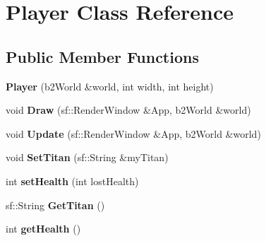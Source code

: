 \hypertarget{class_player}{}\section{Player Class Reference}
\label{class_player}
\subsection*{Public Member Functions}
\begin{DoxyCompactItemize}
\item 
{\bfseries Player} (b2\+World \&world, int width, int height)\hypertarget{class_player_a45259de566657544f89425bafdbf1eb5}{}\label{class_player_a45259de566657544f89425bafdbf1eb5}

\item 
void {\bfseries Draw} (sf\+::\+Render\+Window \&App, b2\+World \&world)\hypertarget{class_player_aa971414575a564645a3edfd906dd3b5a}{}\label{class_player_aa971414575a564645a3edfd906dd3b5a}

\item 
void {\bfseries Update} (sf\+::\+Render\+Window \&App, b2\+World \&world)\hypertarget{class_player_a8bb4ad7a5be7d84b428f6616656fb40b}{}\label{class_player_a8bb4ad7a5be7d84b428f6616656fb40b}

\item 
void {\bfseries Set\+Titan} (sf\+::\+String \&my\+Titan)\hypertarget{class_player_a3cdf52f3a4a76238113f3f5fb5a69244}{}\label{class_player_a3cdf52f3a4a76238113f3f5fb5a69244}

\item 
int {\bfseries set\+Health} (int lost\+Health)\hypertarget{class_player_a1b53c75a88ca704bfedf7d679d4e8666}{}\label{class_player_a1b53c75a88ca704bfedf7d679d4e8666}

\item 
sf\+::\+String {\bfseries Get\+Titan} ()\hypertarget{class_player_a7ea1821a2e2a67f2213dbc4803e2994e}{}\label{class_player_a7ea1821a2e2a67f2213dbc4803e2994e}

\item 
int {\bfseries get\+Health} ()\hypertarget{class_player_abcb15d249bed9a4ab0ab86b52b0d747a}{}\label{class_player_abcb15d249bed9a4ab0ab86b52b0d747a}

\end{DoxyCompactItemize}
